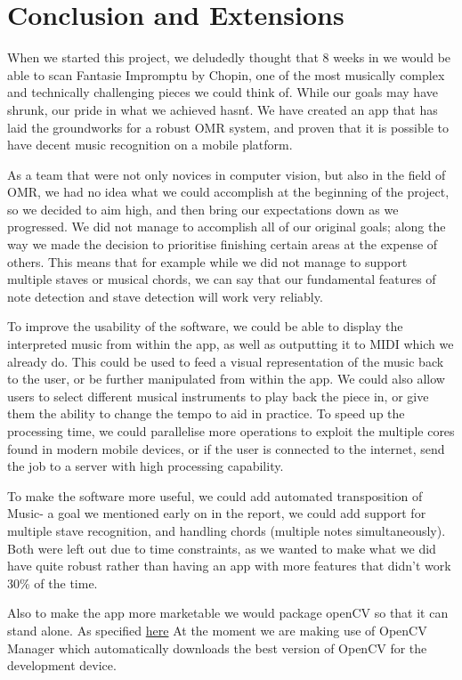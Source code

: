 \section{Conclusion and Extensions}

When we started this project, we deludedly thought that 8 weeks in we would be able to scan Fantasie Impromptu by Chopin, one of the most musically complex and technically challenging pieces we could think of. While our goals may have shrunk, our pride in what we achieved hasn\'t. We have created an app that has laid the groundworks for a robust OMR system, and proven that it is possible to have decent music recognition on a mobile platform. 

As a team that were not only novices in computer vision, but also in the field of OMR, we had no idea what we could accomplish at the beginning of the project, so we decided to aim high, and then bring our expectations down as we progressed. We did not manage to accomplish all of our original goals; along the way we made the decision to prioritise finishing certain areas at the expense of others. This means that for example while we did not manage to support multiple staves or musical chords, we can say that our fundamental features of note detection and stave detection will work very reliably.
 
To improve the usability of the software, we could be able to display the interpreted music from within the app, as well as outputting it to MIDI which we already do. This could be used to feed a visual representation of the music back to the user, or be further manipulated from within the app. We could also allow users to select different musical instruments to play back the piece in, or give them the ability to change the tempo to aid in practice. To speed up the processing time, we could parallelise more operations to exploit the multiple cores found in modern mobile devices, or if the user is connected to the internet, send the job to a server with high processing capability.
 
To make the software more useful, we could add automated transposition of Music- a goal we mentioned early on in the report, we could add support for multiple stave recognition, and handling chords (multiple notes simultaneously). Both were left out due to time constraints, as we wanted to make what we did have quite robust rather than having an app with more features that didn’t work 30\% of the time.

Also to make the app more marketable we would package openCV so that it can stand alone. As specified \href{http://docs.opencv.org/doc/tutorials/introduction/android_binary_package/dev_with_OCV_on_Android.html}{here}
At the moment we are making use of OpenCV Manager which automatically downloads the best version of OpenCV for the development device.


